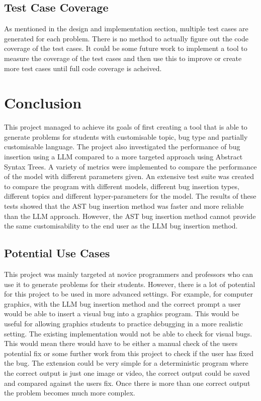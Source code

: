 \documentclass[12pt]{extarticle}
\begin{document}
\subsection{Test Case Coverage}

As mentioned in the design and implementation section, multiple test cases are generated for each problem. There is no method to actually figure out the code coverage of the test cases. It could be some future work to implement a tool to measure the coverage of the test cases and then use this to improve or create more test cases until full code coverage is acheived. 


\newpage
\section{Conclusion}

This project managed to achieve its goals of first creating a tool that is able to generate problems for students with customisable topic, bug type and partially customisable language. The project also investigated the performance of bug insertion using a LLM compared to a more targeted approach using Abstract Syntax Trees. A variety of metrics were implemented to compare the performance of the model with different parameters given. An extensive test suite was created to compare the program with different models, different bug insertion types, different topics and different hyper-parameters for the model. The results of these tests showed that the AST bug insertion method was faster and more reliable than the LLM approach. However, the AST bug insertion method cannot provide the same customisability to the end user as the LLM bug insertion method.\\

\subsection{Potential Use Cases}

This project was mainly targeted at novice programmers and professors who can use it to generate problems for their students. However, there is a lot of potential for this project to be used in more advanced settings. For example, for computer graphics, with the LLM bug insertion method and the correct prompt a user would be able to insert a visual bug into a graphics program. This would be useful for allowing graphics students to practice debugging in a more realistic setting. The existing implementation would not be able to check for visual bugs. This would mean there would have to be either a manual check of the users potential fix or some further work from this project to check if the user has fixed the bug. The extension could be very simple for a deterministic program where the correct output is just one image or video, the correct output could be saved and compared against the users fix. Once there is more than one correct output the problem becomes much more complex.
\end{document}
